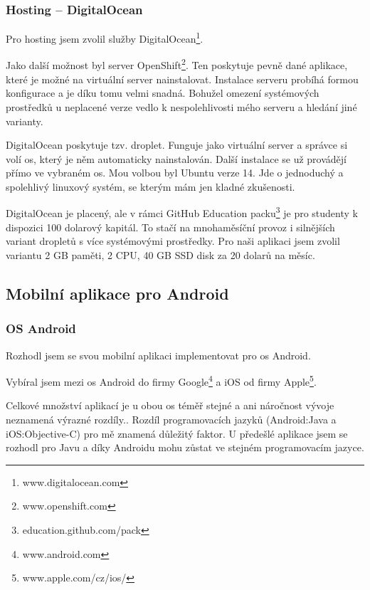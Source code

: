 \documentclass[thesis=B,czech]{FITthesis}[2012/06/26]
\begin{document}
\subsubsection{Hosting -- DigitalOcean}
\label{technology:hosting}
Pro hosting jsem zvolil služby DigitalOcean\footnote{www.digitalocean.com}.

Jako další možnost byl server OpenShift\footnote{www.openshift.com}. Ten poskytuje pevně dané aplikace, které je možné na virtuální server nainstalovat. Instalace serveru probíhá formou konfigurace a je díku tomu velmi snadná. Bohužel omezení systémových prostředků u neplacené verze vedlo k nespolehlivosti mého serveru a hledání jiné varianty. 

DigitalOcean poskytuje tzv. droplet. Funguje jako virtuální server a správce si volí \acrshort{os}, který je něm automaticky nainstalován. Další instalace se už provádějí přímo ve vybraném \acrshort{os}. Mou volbou byl Ubuntu verze 14. Jde o jednoduchý a spolehlivý linuxový systém, se kterým mám jen kladné zkušenosti. 

DigitalOcean je placený, ale v rámci GitHub Education packu\footnote{education.github.com/pack} je pro studenty k dispozici 100 dolarový kapitál. To stačí na mnohaměsíční provoz i silnějších variant dropletů s více systémovými prostředky. Pro naši aplikaci jsem zvolil variantu 2 GB paměti, 2 CPU, 40 GB SSD disk za 20 dolarů na měsíc.  

\subsection{Mobilní aplikace pro Android}


\subsubsection {OS Android}
\label{technology:andoid}
Rozhodl jsem se svou mobilní aplikaci implementovat pro \acrshort{os} Android.

Vybíral jsem mezi \acrshort{os} Android do firmy Google\footnote{www.android.com} a iOS od firmy Apple\footnote{www.apple.com/cz/ios/}.
 
Celkové množství aplikací je u obou \acrshort{os} téměř stejné a ani náročnost vývoje neznamená výrazné rozdíly.\cite{android_what_choose}. Rozdíl programovacích jazyků (Android:Java a iOS:Objective-C) pro mě znamená důležitý faktor. U předešlé aplikace jsem se rozhodl pro Javu a díky Androidu mohu zůstat ve stejném programovacím jazyce.
\end{document}
